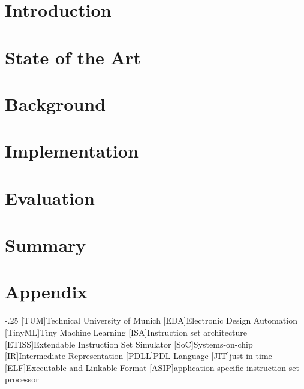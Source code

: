 \documentclass[headsepline,footsepline,footinclude=false,oneside,fontsize=11pt,paper=a4,listof=totoc,bibliography=totoc]{scrbook} %
\begin{document}


\frontmatter{}




\tableofcontents{}

\mainmatter{}

\chapter{Introduction}


\chapter{State of the Art}


\chapter{Background}


\chapter{Implementation}


\chapter{Evaluation}


\chapter{Summary}



\chapter{Appendix}
\label{chapters:appendix}




\begin{acronym}
	\itemsep-.25\baselineskip
	[TUM]{Technical University of Munich}
    [EDA]{Electronic Design Automation}
    [TinyML]{Tiny Machine Learning}
    [ISA]{Instruction set architecture}
    [ETISS]{Extendable Instruction Set Simulator}
    [SoC]{Systems-on-chip}
    [IR]{Intermediate Representation}
    [PDLL]{PDL Language}
    [JIT]{just-in-time}
    [ELF]{Executable and Linkable Format}
    [ASIP]{application-specific instruction set processor}
\end{acronym}

\listoffigures{}
\listoftables{}
\printbibliography{}
\end{document}
